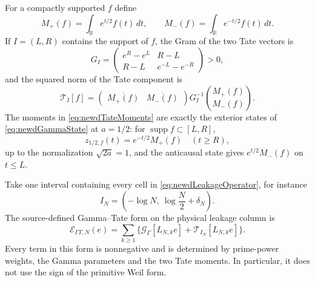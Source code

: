\documentclass[11pt]{amsart}
\theoremstyle{definition}
\theoremstyle{remark}
\newcommand{\R}{\mathbb R}
\begin{document}
For a compactly supported $f$ define
\begin{equation}\label{eq:newdTateMoments}
 M_+(f)=\int_\R e^{t/2}f(t)\,dt,
 \qquad
 M_-(f)=\int_\R e^{-t/2}f(t)\,dt.
\end{equation}
If $I=(L,R)$ contains the support of $f$, the Gram of the two Tate vectors is
\begin{equation}\label{eq:newdExteriorTateGram}
 G_I=
 \begin{pmatrix}
 e^R-e^L&R-L\\
 R-L&e^{-L}-e^{-R}
 \end{pmatrix}>0,
\end{equation}
and the squared norm of the Tate component is
\begin{equation}\label{eq:newdTateTerminalForm}
 \mathcal T_I[f]=
 \begin{pmatrix}\overline{M_+(f)}&\overline{M_-(f)}\end{pmatrix}
 G_I^{-1}
 \binom{M_+(f)}{M_-(f)}.
\end{equation}
The moments in \eqref{eq:newdTateMoments} are exactly the exterior states of
\eqref{eq:newdGammaState} at $a=1/2$: for
$\operatorname{supp}f\subset[L,R]$,
\[
 z_{1/2,f}(t)=e^{-t/2}M_+(f)\quad(t\geq R),
\]
up to the normalization $\sqrt{2a}=1$, and the anticausal state gives
$e^{t/2}M_-(f)$ on $t\leq L$.

Take one interval containing every cell in
\eqref{eq:newdLeakageOperator}, for instance
\begin{equation}\label{eq:newdGlobalLeakageInterval}
 I_N=\left(-\log N,\ \log\frac N2+\delta_N\right).
\end{equation}
The source-defined Gamma--Tate form on the physical leakage column is
\begin{equation}\label{eq:newdGammaTateForm}
 \mathcal E_{\Gamma T,N}(e)=
 \sum_{k\geq1}
 \bigl\{\mathcal G_\Gamma[L_{N,k}e]
       +\mathcal T_{I_N}[L_{N,k}e]\bigr\}.
\end{equation}
Every term in this form is nonnegative and is determined by prime-power
weights, the Gamma parameters and the two Tate moments.  In particular, it
does not use the sign of the primitive Weil form.
\end{document}

